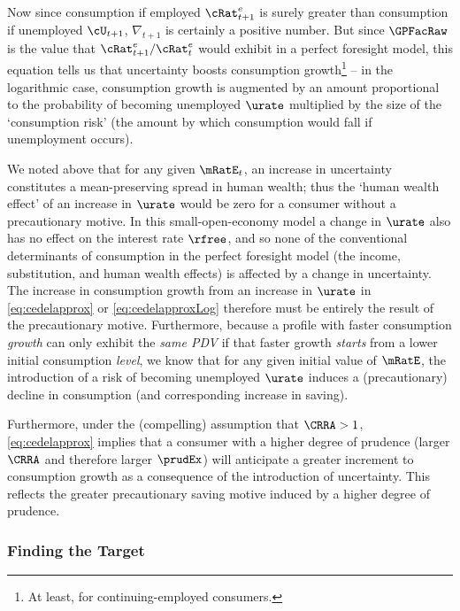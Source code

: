 \documentclass{\handout}
\begin{document}
Now since consumption if employed ${\cRat}^{e}_{t+1}$ is surely greater than consumption if unemployed $\cU_{t+1}$, $\nabla _{t+1}$ is certainly a positive number.  But since ${\GPFacRaw}$ is the value that ${\cRat}^{e}_{t+1}/{\cRat}^{e}_{t}$ would exhibit in a perfect foresight model, this equation tells us that uncertainty boosts consumption growth\footnote{At least, for continuing-employed consumers.} -- in the logarithmic case, consumption growth is augmented by an amount proportional to the probability of becoming unemployed $\urate$ multiplied by the size of the `consumption risk' (the amount by which consumption would fall if unemployment occurs).

We noted above that for any given $\mRatE_{t}$, an increase in uncertainty constitutes a mean-preserving spread in human wealth; thus the `human wealth effect' of an increase in $\urate$ would be zero for a consumer without a precautionary motive.  In this small-open-economy model a change in $\urate$ also has no effect on the interest rate $\rfree$, and so none of the conventional determinants of consumption in the perfect foresight model (the income, substitution, and human wealth effects) is affected by a change in uncertainty.  The increase in consumption growth from an increase in $\urate$ in \eqref{eq:cedelapprox} or \eqref{eq:cedelapproxLog} therefore must be entirely the result of the precautionary motive.  Furthermore, because a profile with faster consumption {\it growth} can only exhibit the {\it same PDV} if that faster growth {\it starts} from a lower initial consumption {\it level}, we know that for any given initial value of $\mRatE$, the introduction of a risk of becoming unemployed $\urate$ induces a (precautionary) decline in consumption (and corresponding increase in saving).

Furthermore, under the (compelling) assumption that $\CRRA > 1$, \eqref{eq:cedelapprox} implies that a consumer with
a higher degree of prudence (larger $\CRRA$ and therefore larger $\prudEx$) will
anticipate a greater increment to consumption growth as a consequence of the introduction of uncertainty.  This reflects the greater precautionary
saving motive induced by a higher degree of prudence.



\subsubsection{Finding the Target}
\end{document}
